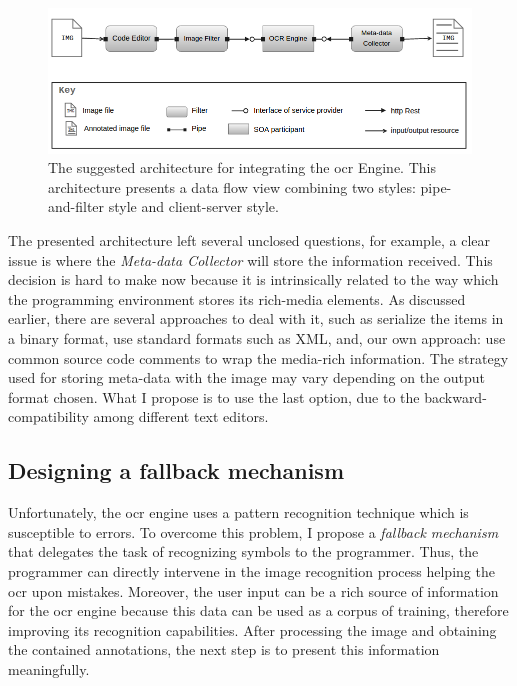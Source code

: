 \begin{figure}[!h]
  \centering
  \includegraphics[width=.7\textwidth]{images/sc-tool-architecture}
    \caption{The suggested architecture for integrating the \gls{ocr} Engine. This architecture presents a data flow view combining two styles: pipe-and-filter style and client-server style.}
  \label{fig:sc-tool-arch}
\end{figure}

The presented architecture left several unclosed questions, for example, a clear issue is where the \textit{Meta-data Collector} will store the information received. This decision is hard to make now because it is intrinsically related to the way which the programming environment stores its rich-media elements. As discussed earlier, there are several approaches to deal with it, such as serialize the items in a binary format, use standard formats such as XML, and, our own approach: use common source code comments to wrap the media-rich information. The strategy used for storing meta-data with the image may vary depending on the output format chosen. What I propose is to use the last option, due to the backward-compatibility among different text editors.

\subsection{Designing a fallback mechanism}

Unfortunately, the \gls{ocr} engine uses a pattern recognition technique which is susceptible to errors. To overcome this problem, I propose a \textit{fallback mechanism} that delegates the task of recognizing symbols to the programmer. Thus, the programmer can directly intervene in the image recognition process helping the \gls{ocr} upon mistakes. Moreover, the user input can be a rich source of information for the \gls{ocr} engine because this data can be used as a corpus of training, therefore improving its recognition capabilities. After processing the image and obtaining the contained annotations, the next step is to present this information meaningfully.

